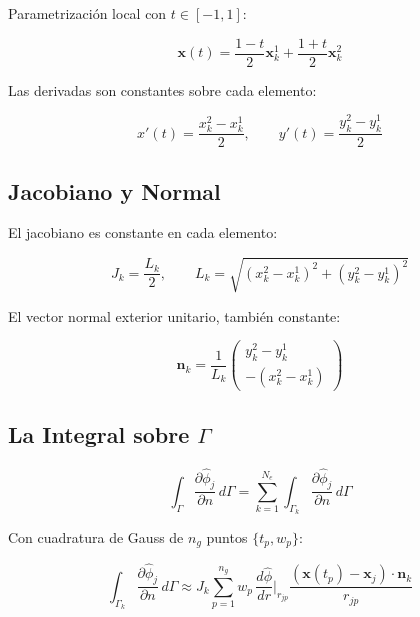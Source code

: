 \documentclass[12pt,a4paper]{article}
\begin{document}
Parametrización local con $t\in[-1,1]$:

\begin{equation}
    \mathbf{x}(t) = \frac{1-t}{2}\mathbf{x}_k^1 + \frac{1+t}{2}\mathbf{x}_k^2
\end{equation}

Las derivadas son constantes sobre cada elemento:

\begin{equation}
    x'(t) = \frac{x_k^2 - x_k^1}{2}, \qquad y'(t) = \frac{y_k^2 - y_k^1}{2}
\end{equation}

\subsection{Jacobiano y Normal}

El jacobiano es constante en cada elemento:

\begin{equation}
    J_k = \frac{L_k}{2},
    \qquad L_k = \sqrt{(x_k^2-x_k^1)^2 + (y_k^2-y_k^1)^2}
\end{equation}

El vector normal exterior unitario, también constante:

\begin{equation}
    \mathbf{n}_k = \frac{1}{L_k}
    \begin{pmatrix} y_k^2 - y_k^1 \\ -(x_k^2 - x_k^1) \end{pmatrix}
\end{equation}

\subsection{La Integral sobre $\Gamma$}

\begin{equation}
    \int_\Gamma \frac{\partial\hat{\phi}_j}{\partial n}\,d\Gamma
    = \sum_{k=1}^{N_e} \int_{\Gamma_k} \frac{\partial\hat{\phi}_j}{\partial n}
    \,d\Gamma
\end{equation}

Con cuadratura de Gauss de $n_g$ puntos $\{t_p, w_p\}$:

\begin{equation}
    \int_{\Gamma_k}\frac{\partial\hat{\phi}_j}{\partial n}\,d\Gamma
    \approx J_k \sum_{p=1}^{n_g} w_p\,\frac{d\hat{\phi}}{dr}\bigg|_{r_{jp}}
    \frac{(\mathbf{x}(t_p) - \mathbf{x}_j)\cdot\mathbf{n}_k}{r_{jp}}
\end{equation}
\end{document}
